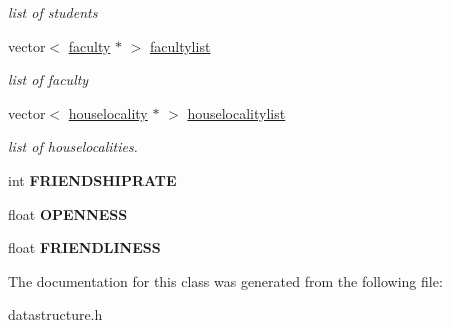\begin{DoxyCompactItemize}
\begin{DoxyCompactList}\small\item\em list of students \end{DoxyCompactList}\item 
\hypertarget{classuniversity_a9d58bf68d967cb4c73e01adae1de8c8d}{vector$<$ \hyperlink{classfaculty}{faculty} $\ast$ $>$ \hyperlink{classuniversity_a9d58bf68d967cb4c73e01adae1de8c8d}{facultylist}}\label{classuniversity_a9d58bf68d967cb4c73e01adae1de8c8d}

\begin{DoxyCompactList}\small\item\em list of faculty \end{DoxyCompactList}\item 
\hypertarget{classuniversity_a7a4ef3a5330042a71cf69eb8ae0cd10e}{vector$<$ \hyperlink{classhouselocality}{houselocality} $\ast$ $>$ \hyperlink{classuniversity_a7a4ef3a5330042a71cf69eb8ae0cd10e}{houselocalitylist}}\label{classuniversity_a7a4ef3a5330042a71cf69eb8ae0cd10e}

\begin{DoxyCompactList}\small\item\em list of houselocalities. \end{DoxyCompactList}\item 
\hypertarget{classuniversity_a9239bd8e8b4b4fa9cd9f4f82b6cf3544}{int {\bfseries \-F\-R\-I\-E\-N\-D\-S\-H\-I\-P\-R\-A\-T\-E}}\label{classuniversity_a9239bd8e8b4b4fa9cd9f4f82b6cf3544}

\item 
\hypertarget{classuniversity_a9ebc5e7022fae4522f81436ba8c0d054}{float {\bfseries \-O\-P\-E\-N\-N\-E\-S\-S}}\label{classuniversity_a9ebc5e7022fae4522f81436ba8c0d054}

\item 
\hypertarget{classuniversity_a8e81c0d71184a5b2d87b152aeee42ef1}{float {\bfseries \-F\-R\-I\-E\-N\-D\-L\-I\-N\-E\-S\-S}}\label{classuniversity_a8e81c0d71184a5b2d87b152aeee42ef1}

\end{DoxyCompactItemize}


\-The documentation for this class was generated from the following file\-:\begin{DoxyCompactItemize}
\item 
datastructure.\-h\end{DoxyCompactItemize}
